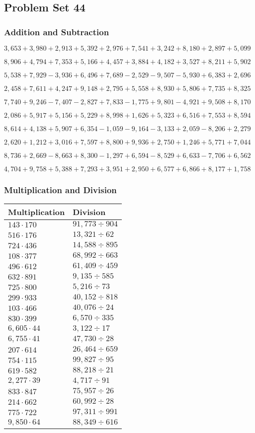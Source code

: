 \hypertarget{problem-set-44-2}{%
\subsection{Problem Set 44}\label{problem-set-44-2}}

\hypertarget{addition-and-subtraction-206}{%
\subsubsection{Addition and
Subtraction}\label{addition-and-subtraction-206}}

\(3,653+3,980+2,913+5,392+2,976+7,541+3,242+8,180+2,897+ 5,099\)

\(8,906+4,794+7,353+5,166+4,457+3,884+4,182+3,527+8,211+5,902\)

\(5,538+7,929-3,936+6,496+7,689-2,529-9,507-5,930+6,383+2,696\)

\(2,458+7,611+4,247+9,148+2,795+5,558+8,930+5,806+7,735+8,325\)

\(7,740+9,246-7,407-2,827+7,833-1,775+9,801-4,921+9,508+8,170\)

\(2,086+5,917+5,156+5,229+8,998+1,626+5,323+6,516+7,553+8,594\)

\(8,614+4,138+5,907+6,354-1,059-9,164-3,133+2,059-8,206+2,279\)

\(2,620+1,212+3,016+7,597+8,800+9,936+2,750+1,246+5,771+7,044\)

\(8,736+2,669-8,663+8,300-1,297+6,594-8,529+6,633-7,706+6,562\)

\(4,704+9,758+5,388+7,293+3,951+2,950+6,577+6,866+8,177+1,758\)

\hypertarget{multiplication-and-division-205}{%
\subsubsection{Multiplication and
Division}\label{multiplication-and-division-205}}

\begin{longtable}[]{@{}ll@{}}
\toprule
Multiplication & Division\tabularnewline
\midrule
\endhead
\(143\cdot170\) & \(91,773÷904\)\tabularnewline
\(516\cdot176\) & \(13,321÷62\)\tabularnewline
\(724\cdot436\) & \(14,588÷895\)\tabularnewline
\(108\cdot377\) & \(68,992÷663\)\tabularnewline
\(496\cdot612\) & \(61,409÷459\)\tabularnewline
\(632\cdot891\) & \(9,135÷585\)\tabularnewline
\(725\cdot800\) & \(5,216÷73\)\tabularnewline
\(299\cdot933\) & \(40,152÷818\)\tabularnewline
\(103\cdot466\) & \(40,076÷24\)\tabularnewline
\(830\cdot399\) & \(6,570÷335\)\tabularnewline
\(6,605\cdot44\) & \(3,122÷17\)\tabularnewline
\(6,755\cdot41\) & \(47,730÷28\)\tabularnewline
\(207\cdot614\) & \(26,464÷659\)\tabularnewline
\(754\cdot115\) & \(99,827÷95\)\tabularnewline
\(619\cdot582\) & \(88,218÷21\)\tabularnewline
\(2,277\cdot39\) & \(4,717÷91\)\tabularnewline
\(833\cdot847\) & \(75,957÷26\)\tabularnewline
\(214\cdot662\) & \(60,992÷28\)\tabularnewline
\(775\cdot722\) & \(97,311÷991\)\tabularnewline
\(9,850\cdot64\) & \(88,349÷616\)\tabularnewline
\bottomrule
\end{longtable}

